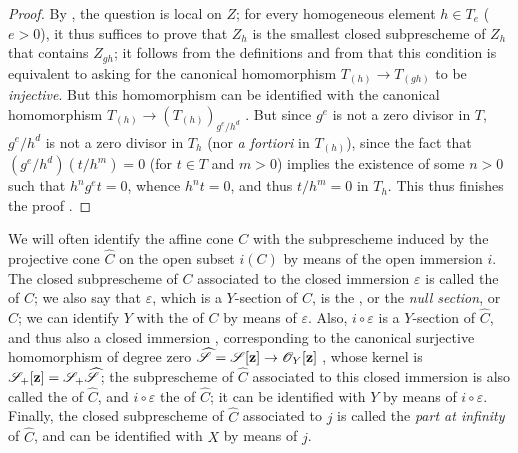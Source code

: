 \begin{proof}
By , the question is local on $Z$;
for every homogeneous element $h\in T_e$ ($e>0$), it thus suffices to prove that $Z_h$ is the smallest closed subprescheme of $Z_h$ that contains $Z_{gh}$;
it follows from the definitions and from  that this condition is equivalent to asking for the canonical homomorphism $T_{(h)}\to T_{(gh)}$ to be \emph{injective}.
But this homomorphism can be identified with the canonical homomorphism $T_{(h)}\to(T_{(h)})_{g^e/h^d}$ .
But since $g^e$ is not a zero divisor in $T$, $g^e/h^d$ is not a zero divisor in $T_h$ (nor \emph{a fortiori} in $T_{(h)}$), since the fact that $(g^e/h^d)(t/h^m)=0$ (for $t\in T$ and $m>0$) implies the existence of some $n>0$ such that $h^ng^et=0$, whence $h^nt=0$, and thus $t/h^m=0$ in $T_h$.
This thus finishes the proof .
\end{proof}

\begin{env}[8.3.3]
\label{II.8.3.3}
We will often identify the affine cone $C$ with the subprescheme induced by the projective cone $\widehat{C}$ on the open subset $i(C)$ by means of the open immersion $i$.
The closed subprescheme of $C$ associated to the closed immersion $\varepsilon$ is called the  of $C$;
we also say that $\varepsilon$, which is a $Y$-section of $C$, is the , or the \emph{null section},  or $C$;
we can identify $Y$ with the  of $C$ by means of $\varepsilon$.
Also, $i\circ\varepsilon$ is a $Y$-section of $\widehat{C}$, and thus also a closed immersion , corresponding to the canonical surjective homomorphism of degree zero $\widehat{\sh{S}} = \sh{S}[\bb{z}] \to \sh{O}_Y[\bb{z}]$ , whose kernel is $\mathscr{S}_+[\mathbf{z}] = \mathscr{S}_+\widehat{\mathscr{S}}$;
the subprescheme of $\widehat{C}$ associated to this closed immersion is also called the  of $\widehat{C}$, and $i\circ\varepsilon$ the  of $\widehat{C}$;
it can be identified with $Y$ by means of $i\circ\varepsilon$.
Finally, the closed subprescheme of $\widehat{C}$ associated to $j$ is called the \emph{part at infinity} of $\widehat{C}$, and can be identified with $X$ by means of $j$.
\end{env}

